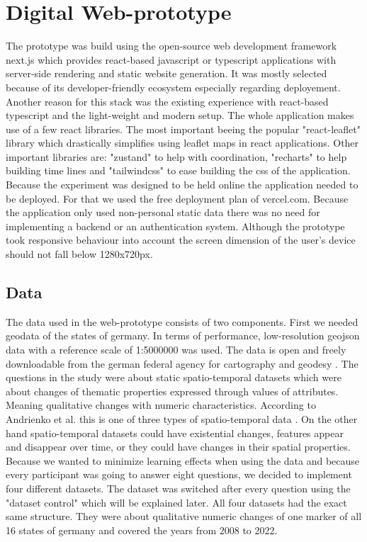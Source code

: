 \chapter{Digital Web-prototype}
The prototype was build using the open-source web development framework next.js which provides react-based javascript or
typescript applications with server-side rendering and static website generation. It was mostly selected because of its
developer-friendly ecosystem especially regarding deployement. Another reason for this stack was the existing experience
with react-based typescript and the light-weight and modern setup. The whole application makes use of a few react libraries.
The most important beeing the popular "react-leaflet" library which drastically simplifies using leaflet maps in react
applications. Other important libraries are: "zustand" to help with coordination, "recharts" to help building time lines and
"tailwindcss" to ease building the css of the application. Because the experiment was designed to be held online the
application needed to be deployed. For that we used the free deployment plan of vercel.com. Because the application only
used non-personal static data there was no need for implementing a backend or an authentication system. Although the prototype
took responsive behaviour into account the screen dimension of the user's device should not fall below 1280x720px. 
\section{Data}
The data used in the web-prototype consists of two components. First we needed geodata of the states of germany. In terms of
performance, low-resolution geojson data with a reference scale of 1:5000000 was used. The data is open and freely downloadable
from the german federal agency for cartography and geodesy \citep*{gdz.bkg}. The questions in the study were about static
spatio-temporal datasets which were about changes of thematic properties expressed through values of attributes. Meaning
qualitative changes with numeric characteristics. According to Andrienko et al. this is one of three types of spatio-temporal
data \citep*{Andrienko.2003}. On the other hand spatio-temporal datasets could have existential changes, features appear and
disappear over time, or they could have changes in their spatial properties. Because we wanted to minimize learning effects
when using the data and because every participant was going to answer eight questions, we decided to implement four different
datasets. The dataset was switched after every question using the "dataset control" which will be explained later. All four datasets
had the exact same structure. They were about qualitative numeric changes of one marker of all 16 states of germany and covered
the years from 2008 to 2022.
